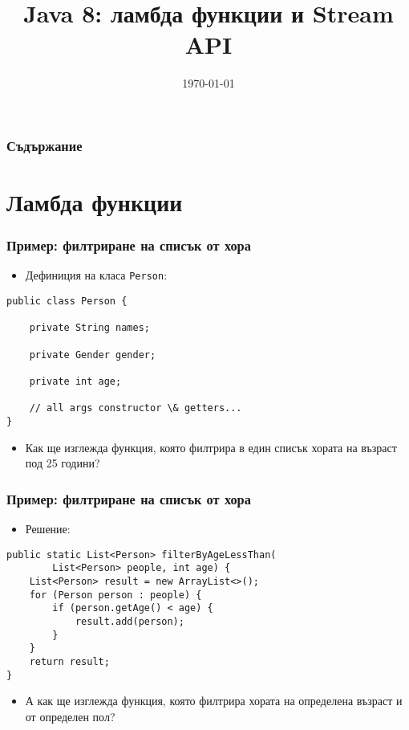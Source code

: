 \documentclass[ignorenonframetext, hyperref=unicode,compress,pdflatex]{beamer}
\title{Java 8: ламбда функции и Stream API}
\date{\today}
\begin{document}
\frame{\titlepage}


\begin{frame}
\frametitle{Съдържание}
\tableofcontents
\end{frame}


\section{Ламбда функции}

\begin{frame}[containsverbatim]\frametitle{Пример: филтриране на списък от хора}
\begin{itemize}
\item Дефиниция на класа \lstinline{Person}:
\end{itemize}
\begin{lstlisting}
public class Person {

	private String names;

	private Gender gender;

	private int age;

    // all args constructor \& getters...
}
\end{lstlisting}
\begin{itemize}
\item Как ще изглежда функция, която филтрира в един списък хората на възраст
под 25 години?
\end{itemize}
\end{frame}


\begin{frame}[containsverbatim]\frametitle{Пример: филтриране на списък от хора}
\begin{itemize}
\item Решение:
\end{itemize}
\begin{lstlisting}
public static List<Person> filterByAgeLessThan(
		List<Person> people, int age) {
	List<Person> result = new ArrayList<>();
	for (Person person : people) {
		if (person.getAge() < age) {
			result.add(person);
		}
	}
	return result;
}
\end{lstlisting}
\begin{itemize}
\item А как ще изглежда функция, която филтрира хората на определена възраст и
от определен пол?
\end{itemize}
\end{frame}
\end{document}
